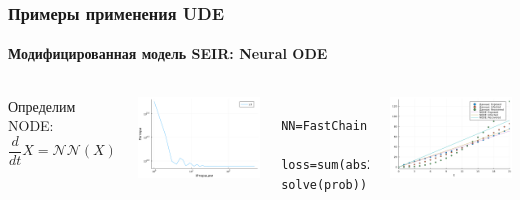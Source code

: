 \documentclass[10pt,pdf,hyperref={unicode}]{beamer}
\begin{document}
			\begin{frame}[fragile]
				\frametitle{Примеры применения UDE} 
				\framesubtitle{Модифицированная модель SEIR: Neural ODE}
					\begin{columns}
						\begin{center}
							Определим NODE:
							\begin{displaymath}
							\frac{d}{dt}X = \mathcal{NN}(X)
							\end{displaymath}
						\end{center}
						\includegraphics[width=.9\columnwidth]{neuralode_loss.png}
						\begin{verbatim}
							NN=FastChain(...)
							loss=sum(abs2,data.-solve(prob))
						\end{verbatim}
						\includegraphics[width=.9\columnwidth]{neuralode_train.png}
					\end{columns}
			\end{frame}
		
\end{document}
